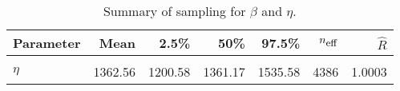 \begin{table}
\centering
\caption{\label{tab:idler-frame-posterior-summary}Summary of sampling for $\beta$ and $\eta$.}
\centering
\begin{tabular}[t]{lrrrrrr}
\toprule
Parameter & Mean & 2.5\% & 50\% & 97.5\% & $n_{\small{\mbox{eff}}}$ & $\hat{R}$\\
\midrule
\cellcolor{gray!10}{$\beta$} & \cellcolor{gray!10}{1.10} & \cellcolor{gray!10}{1.01} & \cellcolor{gray!10}{1.10} & \cellcolor{gray!10}{1.20} & \cellcolor{gray!10}{5337} & \cellcolor{gray!10}{1.0001}\\
$\eta$ & 1362.56 & 1200.58 & 1361.17 & 1535.58 & 4386 & 1.0003\\
\bottomrule
\end{tabular}
\end{table}
